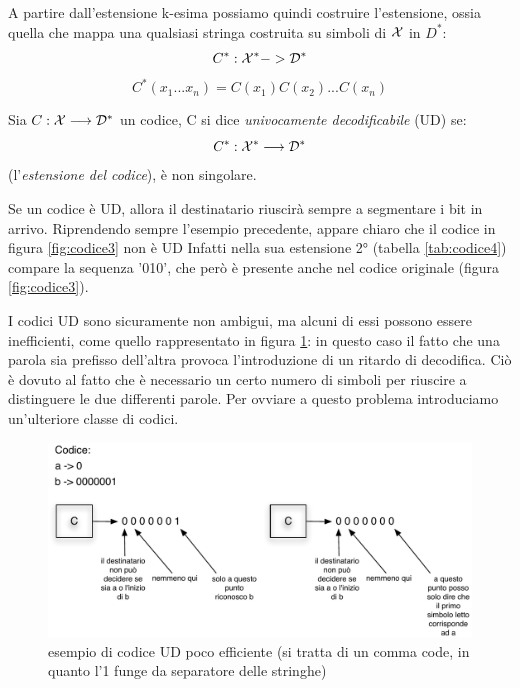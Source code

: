A partire dall'estensione k-esima possiamo quindi costruire l'estensione, ossia quella che mappa una qualsiasi stringa costruita su simboli di \(\mathcal{X}\) in $D^*$:
\[C^*: \mathcal{X}^* -> \mathcal{D}^*\]
\[C^*(x_1... x_n) = C(x_1) C(x_2) ... C(x_n)\]

\begin{definizione}[Codice U.D.]
Sia \(C: \mathcal{X} \longrightarrow \mathcal{D}^*\) un codice, C si dice \textit{univocamente decodificabile} (UD) se:
\[C^*: \mathcal{X}^* \longrightarrow \mathcal{D}^*\]
(l'\textit{estensione del codice}), è non singolare.
\label{codiceUD}
\end{definizione}

Se un codice è UD, allora il destinatario riuscirà sempre a segmentare i bit in arrivo.
Riprendendo sempre l'esempio precedente, appare chiaro che il codice in figura \ref{fig:codice3} non è UD Infatti nella sua estensione 2° (tabella \ref{tab:codice4}) compare la sequenza '010', che però è presente anche nel codice originale (figura \ref{fig:codice3}).


I codici UD sono sicuramente non ambigui, ma alcuni di essi possono essere inefficienti, come quello rappresentato in figura \ref{fig:0024}: in questo caso il fatto che una parola sia prefisso dell'altra provoca l'introduzione di un ritardo di decodifica. Ciò è dovuto al fatto che è necessario un certo numero di simboli per riuscire a distinguere le due differenti parole. Per ovviare a questo problema introduciamo un'ulteriore classe di codici.

\begin{figure}[htbp]
\begin{center}
	\includegraphics[width=\textwidth]{img/istantaneo.pdf}
\caption{esempio di codice UD poco efficiente (si tratta di un comma code, in quanto l'1 funge da separatore delle stringhe)}
\label{fig:0024}
\end{center}
\end{figure}

